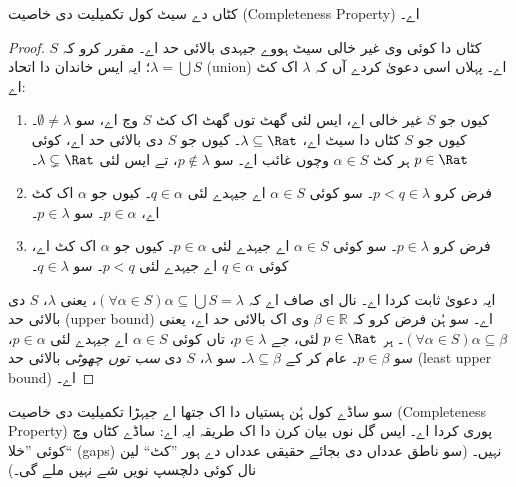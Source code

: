 \documentclass[../../../include/open-logic-section]{subfiles}
\begin{document}
\begin{thm}
کٹاں دے سیٹ کول تکمیلیت دی خاصیت (Completeness Property) اے۔
\end{thm}

\begin{proof}
$S$ کٹاں دا کوئی وی غیر خالی سیٹ ہووے جیہدی بالائی حد اے۔ مقرر کرو کہ
$\lambda = \bigcup S$؛ ایہ ایس خاندان دا اتحاد (union) اے۔
پہلاں اسی دعویٰ کردے آں کہ $\lambda$ اک کٹ اے:
\begin{enumerate}
\item کیوں جو $S$ غیر خالی اے، ایس لئی گھٹ توں گھٹ اک کٹ $S$ وچ اے، سو
$\emptyset \neq \lambda$۔
کیوں جو $S$ کٹاں دا سیٹ اے، $\lambda \subseteq \Rat$۔ کیوں جو $S$ دی
بالائی حد اے، کوئی $p \in \Rat$ ہر کٹ $\alpha \in S$ وچوں غائب اے۔
سو $p\notin \lambda$، تے ایس لئی $\lambda \subsetneq \Rat$۔
\item فرض کرو $p < q \in \lambda$۔ سو کوئی $\alpha \in S$ اے جیہدے
لئی $q \in \alpha$۔ کیوں جو $\alpha$ اک کٹ اے، $p \in \alpha$۔ سو
$p \in \lambda$۔
\item فرض کرو $p \in \lambda$۔ سو کوئی $\alpha \in S$ اے جیہدے لئی
$p \in \alpha$۔ کیوں جو $\alpha$ اک کٹ اے، کوئی $q \in \alpha$ اے
جیہدے لئی $p < q$۔ سو $q \in \lambda$۔
\end{enumerate}
ایہ دعویٰ ثابت کردا اے۔ نال ای صاف اے کہ $(\forall \alpha \in S)\alpha
\subseteq \bigcup S = \lambda$، یعنی $\lambda$، $S$ دی بالائی حد
(upper bound) اے۔ سو ہُن فرض کرو کہ $\beta \in \mathbb{R}$ وی اک بالائی حد اے، یعنی
$(\forall \alpha \in S)\alpha \subseteq \beta$۔ ہر $p \in \Rat$ لئی،
جے $p \in \lambda$، تاں کوئی $\alpha \in S$ اے جیہدے لئی $p \in
\alpha$، سو $p \in \beta$۔ عام کر کے $\lambda \subseteq \beta$۔ سو
$\lambda$، $S$ دی \emph{سب توں چھوٹی} بالائی حد (least upper bound) اے۔
\end{proof}

سو ساڈے کول ہُن ہستیاں دا اک جتھا اے جیہڑا تکمیلیت دی خاصیت
(Completeness Property) پوری کردا اے۔ ایس گل نوں بیان کرن دا اک طریقہ
ایہ اے: ساڈے کٹاں وچ کوئی ”خلا“ (gaps)
نہیں۔ (سو ناطق عدداں دی بجائے حقیقی عدداں دے ہور ”کٹ“ لین نال کوئی
دلچسپ نویں شے نہیں ملے گی۔)
\end{document}
